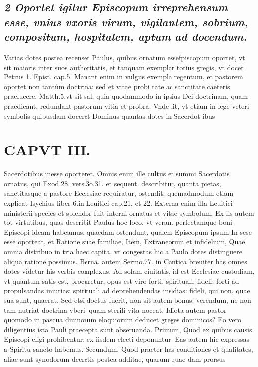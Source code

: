 \documentclass{article}
\begin{document}
\begin{pages}
\subsection*{\textit{2 Oportet igitur Episcopum irreprehensum esse, vnius vxoris virum, vigilantem, sobrium, compositum, hospitalem, aptum ad docendum. }}\pstart Varias dotes postea recenset Paulus, quibus ornatum essefpiscopum oportet, vt sit maioris inter suos authoritatis, et tanquam exemplar totius gregis, vt docet Petrus 1. Epist. cap.5. Manant enim in vulgus exempla regentum, et pastorem oportet non tantùm doctrina: sed et vitae probi tate ac sanctitate caeteris praelucere. Matth.5.vt sit sal, quia quodammodo in ipsius Dei doctrinam, quam praedicant, redundant pastorum vitia et probra. Vnde fit, vt etiam in lege veteri symbolis quibusdam doceret Dominus quantas dotes in Sacerdot ibus  \pend
\section*{CAPVT  III. }
\marginpar{[ p.101 ]}\pstart Sacerdotibus inesse oporteret. Omnis enim ille cultus et summi Sacerdotis ornatus, qui Exod.28. vers.3o.31. et sequent. describitur, quanta pietas, sanctitasque a pastore Ecclesiae requiratur, ostendit: quemadmodum etiam explicat Isychius liber  6.in Leuitici cap.21, et 22. Externa enim illa Leuitici ministerii species et splendor fuit interni ornatus et vitae symbolum. Ex iis autem tot virtutibus, quas describit Paulus hoc loco, vt veram perfectamque boni Episcopi ideam habeamus, quaedam ostendunt, qualem Episcopum ipsum In sese esse oporteat, et Ratione suae familiae, Item, Extraneorum et infidelium, Quae omnia distribuo in tria haec capita, vt congestas hic a Paulo dotes distinguere aliqua ratione possimus. Berna. autem Sermo.77. in Cantica breuiter has omnes dotes videtur his verbis complexus. Ad solam ciuitatis, id est Ecclesiae custodiam, vt quantum satis est, procuretur, opus est viro forti, spirituali, fideli: forti ad propulsandas iniurias: spirituali ad deprehendendas insidias: fideli, qui non, quae sua sunt, quaerat. Sed etsi doctus fuerit, non sit autem bonus: verendum, ne non tam nutriat doctrina vberi, quam sterili vita noceat. Idiota autem pastor quomodo in pascua diuinorum eloquiorum deducet greges dominicos?  \pend\pstart Eo vero diligentius ista Pauli praecepta sunt obseruanda. Primum, Quod ex quibus causis Episcopi eligi prohibentur: ex iisdem electi deponuntur. Eas autem hic expressas a Spiritu sancto habemus. Secundum. Quod praeter has conditiones et qualitates, aliae sunt synodorum decretis postea additae, quarum quae dam prorsus  \pend

\end{pages}
\end{document}
